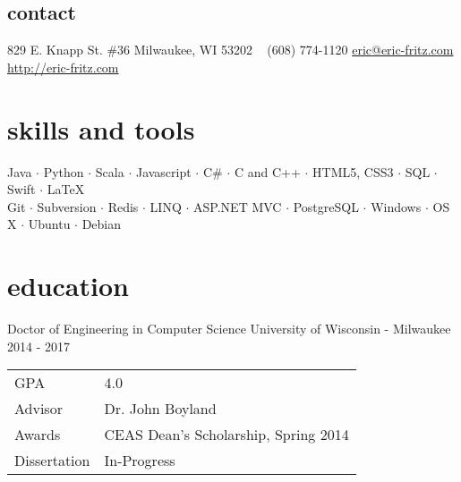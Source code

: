 \documentclass[]{fritz-resume}
\begin{document}


\begin{aside}
  \section{contact}
    829 E. Knapp St. \#36
    Milwaukee, WI 53202
    ~
    (608) 774-1120
    \href{mailto:eric@eric-fritz.com?subject=Resume}{eric@eric-fritz.com}
    \href{http://eric-fritz.com}{http://eric-fritz.com}
\end{aside}


\section{skills and tools}

\begin{centering}
{ \small
  Java $\cdot$
  Python $\cdot$
  Scala $\cdot$
  Javascript $\cdot$
  C\# $\cdot$
  C and C++ $\cdot$
  HTML5, CSS3 $\cdot$
  SQL $\cdot$
  Swift $\cdot$
  \LaTeX{} \\
  Git $\cdot$
  Subversion $\cdot$
  Redis $\cdot$
  LINQ $\cdot$
  ASP.NET MVC $\cdot$
  PostgreSQL $\cdot$
  Windows $\cdot$
  OS X $\cdot$
  Ubuntu $\cdot$
  Debian
}

\end{centering}


\section{education}

\entry
  {Doctor of Engineering in Computer Science}
  {University of Wisconsin - Milwaukee}
  {2014 - 2017}
  {
    \begin{tabular}{>{\raggedleft}p{1.7cm} l}
      GPA          & 4.0 \\
      Advisor      & Dr. John Boyland \\
      Awards       & CEAS Dean's Scholarship, Spring 2014 \\
      Dissertation & In-Progress
    \end{tabular}
  }
\end{document}
